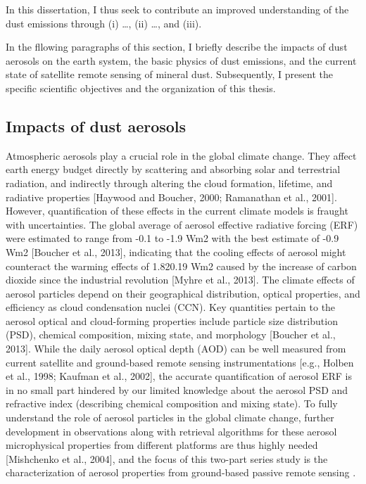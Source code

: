  In this dissertation, I thus seek to contribute an improved understanding 
 of the dust emissions through (i) \ldots, (ii) \ldots, and (iii).

 In the fllowing paragraphs of this section, 
 I briefly describe the impacts of dust aerosols on the earth system, 
 the basic physics of dust emissions, 
 and the current state of satellite remote sensing of mineral dust. 
 Subsequently, I present the specific scientific objectives and the 
 organization of this thesis.  

\subsection{Impacts of dust aerosols}

Atmospheric aerosols play a crucial role in the global 
climate change. They affect earth energy budget directly 
by scattering and absorbing solar and terrestrial radiation, 
and indirectly through altering the cloud formation, 
lifetime, and radiative properties [Haywood and Boucher, 
2000; Ramanathan et al., 2001]. However, quantification of 
these effects in the current climate models is fraught with 
uncertainties. The global average of aerosol effective 
radiative forcing (ERF) were estimated to range from -0.1 
to -1.9 Wm2 with the best estimate of -0.9 Wm2 [Boucher et 
al., 2013], indicating that the cooling effects of aerosol 
might counteract the warming effects of 1.820.19 Wm2 caused
by the increase of carbon dioxide since the industrial 
revolution [Myhre et al., 2013]. The climate effects of 
aerosol particles depend on their geographical distribution, 
optical properties, and efficiency as cloud condensation 
nuclei (CCN). Key quantities pertain to the aerosol optical 
and cloud-forming properties include particle size 
distribution (PSD), chemical composition, mixing state, and 
morphology [Boucher et al., 2013]. While the daily aerosol 
optical depth (AOD) can be well measured from current 
satellite and ground-based remote sensing instrumentations 
[e.g., Holben et al., 1998; Kaufman et al., 2002], the 
accurate quantification of aerosol ERF is in no small part 
hindered by our limited knowledge about the aerosol PSD and 
refractive index (describing chemical composition and 
mixing state). To fully understand the role of aerosol 
particles in the global climate change, further development 
in observations along with retrieval algorithms for these 
aerosol microphysical properties from different platforms 
are thus highly needed [Mishchenko et al., 2004], and 
the focus of this two-part series study is the 
characterization of aerosol properties from ground-based 
passive remote sensing \citep{henze07}. 

